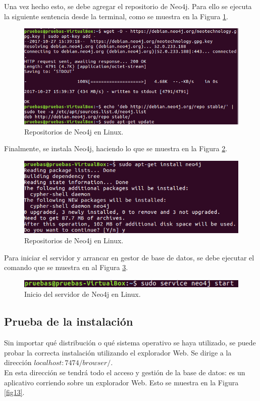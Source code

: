 \documentclass[conference]{IEEEtran}
\begin{document}
Una vez hecho esto, se debe agregar el repositorio de Neo4j. Para ello se ejecuta la siguiente sentencia desde la terminal, como se muestra en la Figura \ref{fig10}.

\begin{figure}[H]
\begin{center}
\includegraphics[width= 0.45 \textwidth]{neo4j_repo_f.png}
\end{center}
\caption{Repositorios de Neo4j en Linux.}
\label{fig10}
\end{figure}

Finalmente, se instala Neo4j, haciendo lo que se muestra en la Figura \ref{fig11}.

\begin{figure}[H]
\begin{center}
\includegraphics[width= 0.45 \textwidth]{install_neo4j.png}
\end{center}
\caption{Repositorios de Neo4j en Linux.}
\label{fig11}
\end{figure}

Para iniciar el servidor y arrancar en gestor de base de datos, se debe ejecutar el comando que se muestra en al Figura \ref{fig12}.

\begin{figure}[H]
\begin{center}
\includegraphics[width= 0.45 \textwidth]{start_service_neo.png}
\end{center}
\caption{Inicio del servidor de Neo4j en Linux.}
\label{fig12}
\end{figure}

\subsection{Prueba de la instalación}

Sin importar qué distribución  o qué sistema operativo se haya utilizado, se puede probar la correcta instalación utilizando el explorador Web. Se dirige a la dirección $localhost:7474/browser/$. 
\\
En esta dirección se tendrá todo el acceso y gestión de la base de datos: es un aplicativo corriendo sobre un explorador Web. Esto se muestra en la Figura \ref{fig13}.
\end{document}

